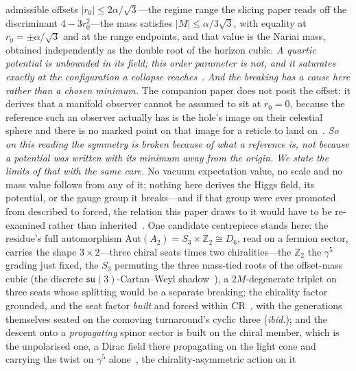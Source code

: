 \documentclass[11pt,a4paper]{article}
\theoremstyle{definition}
\begin{document}
\begin{enumerate}
admissible offsets $|r_{0}|\le2\alpha/\sqrt3$---the regime range the slicing paper reads off the discriminant
$4-3r_{0}^{2}$---the mass satisfies $|M|\le\alpha/3\sqrt3$, with equality at $r_{0}=\pm\alpha/\sqrt3$ and at
the range endpoints, and that value is the Nariai mass, obtained independently as the double root of the
horizon cubic. \emph{A quartic potential is unbounded in its field; this order parameter is not, and it
saturates exactly at the configuration a collapse reaches}~\cite{JanzenCRframework}.
\emph{And the breaking has a cause here rather than a chosen minimum.} The companion paper does not posit the
offset: it derives that a manifold observer cannot be assumed to sit at $r_{0}=0$, because the reference such
an observer actually has is the hole's image on their celestial sphere and there is no marked point on that
image for a reticle to land on~\cite{JanzenSlicing}. \emph{So on this reading the symmetry is broken because
of what a reference is, not because a potential was written with its minimum away from the origin.}
\emph{We state the limits of that with the same care.} No vacuum expectation value, no scale and no mass value
follows from any of it; nothing here derives the Higgs field, its potential, or the gauge group it breaks---and
if that group were ever promoted from described to forced, the relation this paper draws to it would have to be
re-examined rather than inherited~\cite{JanzenBoundary}. One
candidate centrepiece stands here: the residue's
full automorphism $\mathrm{Aut}(A_2)=S_3\times\mathbb{Z}_2\cong D_6$, read on a
fermion sector, carries the shape $3\times2$---three chiral seats times two
chiralities---the $\mathbb{Z}_2$ the $\gamma^5$ grading just fixed, the $S_3$
permuting the three mass-tied roots of the offset-mass cubic (the discrete
$\mathfrak{su}(3)$-Cartan--Weyl shadow~\cite{JanzenAlgebroid}), a $2M$-degenerate
triplet on three seats whose splitting would be a separate breaking; the chirality
factor grounded, and the seat factor \emph{built} and forced within
CR~\cite{JanzenMatter}, with the generations themselves seated on the comoving turnaround's cyclic
three (\emph{ibid.}); and the descent onto a \emph{propagating} spinor sector is
built on the chiral member, which is the unpolarised one, a Dirac field there propagating on the light
cone and carrying the twist on $\gamma^5$ alone~\cite{JanzenDynamics}, the chirality-asymmetric action on it

\end{enumerate}
\end{document}
